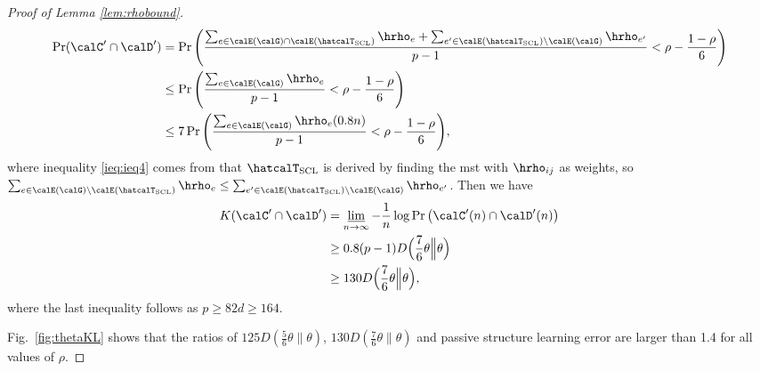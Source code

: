 \documentclass[11pt,onecolumn]{article}
\begin{document}
\begin{proof}[Proof of Lemma \ref{lem:rhobound}]
	\begin{align}
		\Pr( \calC^{\prime}\cap \calD^{\prime})&=\Pr\Bigg(\frac{\sum_{e\in\calE(\calG)\cap\calE( \hatcalT_{\rm{SCL}})}\hrho_{e}+\sum_{e^{\prime}\in\calE( \hatcalT_{\rm{SCL}})\backslash\calE(\calG)}\hrho_{e^{\prime}}}{p-1}<\rho-\frac{1-\rho}{6}\Bigg)\\
		&\leq\Pr\Bigg(\frac{\sum_{e\in\calE(\calG)}\hrho_{e}}{p-1}<\rho-\frac{1-\rho}{6}\Bigg)\label{ieq:ieq4}\\
		&\leq 7\Pr\Bigg(\frac{\sum_{e\in\calE(\calG)}\hrho_{e}(0.8n)}{p-1}<\rho-\frac{1-\rho}{6}\Bigg),
	\end{align}
	where inequality \eqref{ieq:ieq4} comes from that $ \hatcalT_{\rm{SCL}}$ is derived by finding the \ac{mst} with $\hrho_{ij}$ as weights, so $\sum_{e\in\calE(\calG)\backslash\calE( \hatcalT_{\rm{SCL}})}\hrho_{e}\leq\sum_{e^{\prime}\in\calE( \hatcalT_{\rm{SCL}})\backslash\calE(\calG)}\hrho_{e^{\prime}}$. 
	Then we have
	\begin{align}
		K (\calC^{\prime}\cap \calD^{\prime})&=\varliminf_{n\rightarrow\infty}-\frac{1}{n}\log\Pr\big( \calC^{\prime}(n)\cap \calD^{\prime}(n)\big)\\
		&\geq 0.8(p-1)D\Big(\frac{7}{6}\theta\Big\|\theta\Big)\\
		&\geq 130 D\Big(\frac{7}{6}\theta\Big\|\theta\Big),
	\end{align}
	where the last inequality follows as $p\geq 82d\geq 164.$

	Fig.~\ref{fig:thetaKL} shows that the ratios of $125D(\frac{5}{6}\theta\|\theta)$, $130D(\frac{7}{6}\theta\|\theta)$ and passive structure learning error are larger than 1.4 for all  values of $\rho$.
\end{proof}
\end{document}
